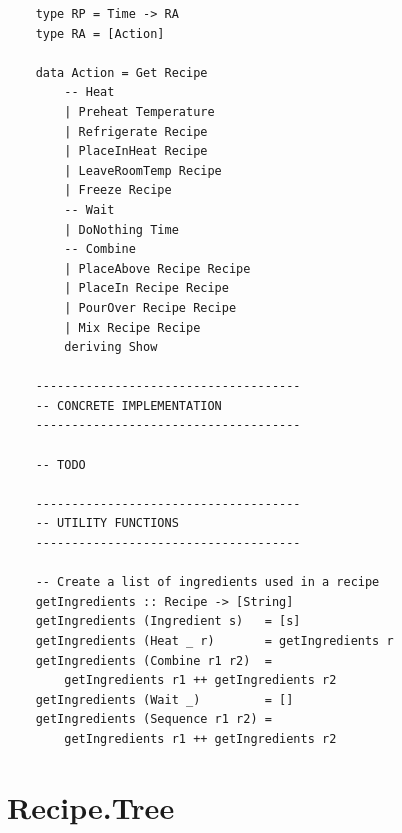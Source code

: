 \documentclass[11pt]{article}
\begin{document}
\begin{tt}
\begin{lstlisting}
    type RP = Time -> RA
    type RA = [Action]
    
    data Action = Get Recipe
        -- Heat
        | Preheat Temperature
        | Refrigerate Recipe
        | PlaceInHeat Recipe
        | LeaveRoomTemp Recipe
        | Freeze Recipe
        -- Wait
        | DoNothing Time
        -- Combine
        | PlaceAbove Recipe Recipe
        | PlaceIn Recipe Recipe
        | PourOver Recipe Recipe
        | Mix Recipe Recipe
        deriving Show
    
    -------------------------------------
    -- CONCRETE IMPLEMENTATION
    -------------------------------------
    
    -- TODO
    
    -------------------------------------
    -- UTILITY FUNCTIONS
    -------------------------------------
    
    -- Create a list of ingredients used in a recipe
    getIngredients :: Recipe -> [String]
    getIngredients (Ingredient s)   = [s]
    getIngredients (Heat _ r)       = getIngredients r
    getIngredients (Combine r1 r2)  =
        getIngredients r1 ++ getIngredients r2
    getIngredients (Wait _)         = []
    getIngredients (Sequence r1 r2) =
        getIngredients r1 ++ getIngredients r2
    \end{lstlisting}
    \end{tt}

    \section{Recipe.Tree}
\end{document}
